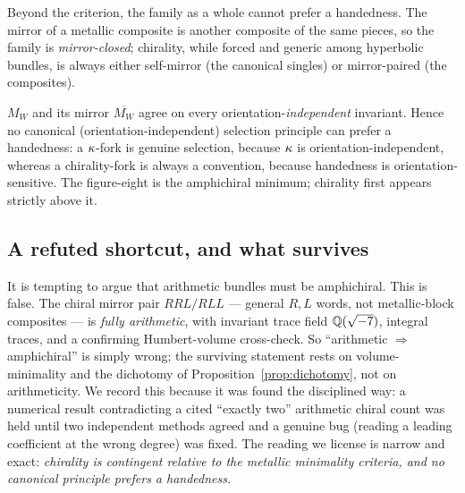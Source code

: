Beyond the criterion, the family as a whole cannot prefer a handedness. The mirror of a
metallic composite is another composite of the same pieces, so the family is
\emph{mirror-closed}; chirality, while forced and generic among hyperbolic bundles, is
always either self-mirror (the canonical singles) or mirror-paired (the composites).

\begin{proposition}[\sStruct]\label{prop:dichotomy}
$M_W$ and its mirror $\overline{M_W}$ agree on every orientation-\emph{independent}
invariant. Hence no canonical (orientation-independent) selection principle can prefer a
handedness: a $\kappa$-fork is genuine selection, because $\kappa$ is orientation-independent,
whereas a chirality-fork is always a convention, because handedness is
orientation-sensitive. The figure-eight is the amphichiral minimum; chirality first
appears strictly above it.
\end{proposition}

\subsection{A refuted shortcut, and what survives}

It is tempting to argue that arithmetic bundles must be amphichiral. This is false. The
chiral mirror pair $RRL/RLL$ --- general $R,L$ words, not metallic-block composites --- is
\emph{fully arithmetic}, with invariant trace field $\mathbb{Q}(\sqrt{-7})$, integral traces, and
a confirming Humbert-volume cross-check. So ``arithmetic $\Rightarrow$ amphichiral'' is
simply wrong; the surviving statement rests on volume-minimality and the dichotomy of
Proposition~\ref{prop:dichotomy}, not on arithmeticity. We record this because it was
found the disciplined way: a numerical result contradicting a cited ``exactly two''
arithmetic chiral count was held until two independent methods agreed and a genuine bug
(reading a leading coefficient at the wrong degree) was fixed. The reading we license is
narrow and exact: \emph{chirality is contingent relative to the metallic minimality
criteria, and no canonical principle prefers a handedness.}
